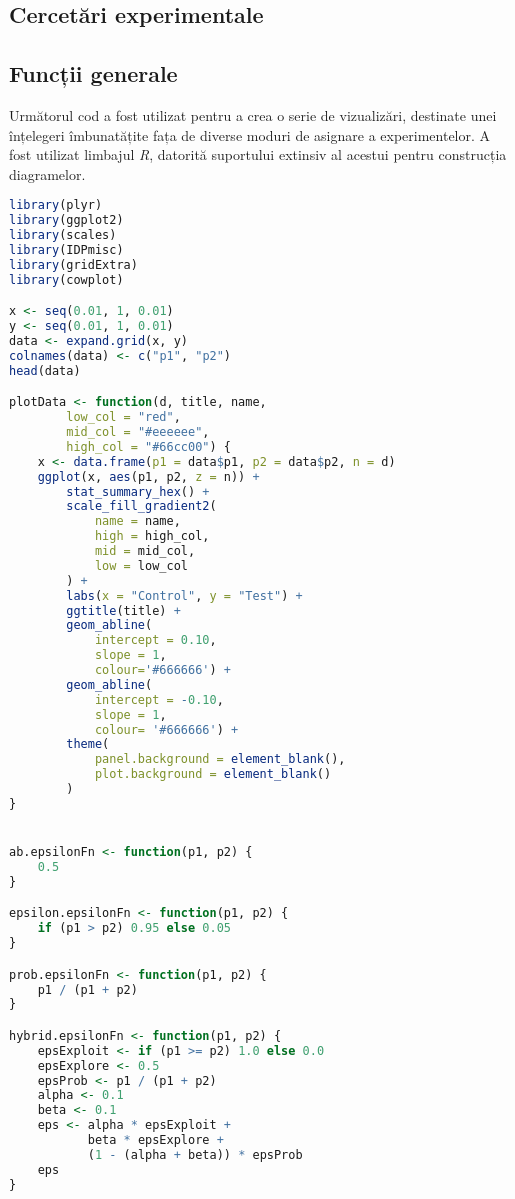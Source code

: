 \begin{appendices}
\chapter{Cercetări experimentale}

\section{Funcții generale}

Următorul cod a fost utilizat pentru a crea o serie de vizualizări, destinate unei înțelegeri îmbunatățite fața de diverse moduri de asignare a experimentelor. A fost utilizat limbajul \textit{R}, datorită suportului extinsiv al acestui pentru construcția diagramelor.

\begin{center}
	\begin{lstlisting}[language=r]
library(plyr)
library(ggplot2)
library(scales)
library(IDPmisc)
library(gridExtra)
library(cowplot)

x <- seq(0.01, 1, 0.01)
y <- seq(0.01, 1, 0.01)
data <- expand.grid(x, y)
colnames(data) <- c("p1", "p2")
head(data)

plotData <- function(d, title, name, 
		low_col = "red",
		mid_col = "#eeeeee", 
		high_col = "#66cc00") {
	x <- data.frame(p1 = data$p1, p2 = data$p2, n = d)
	ggplot(x, aes(p1, p2, z = n)) +  
		stat_summary_hex() + 
		scale_fill_gradient2(
			name = name,
			high = high_col,
			mid = mid_col,
			low = low_col
		) +
		labs(x = "Control", y = "Test") +
		ggtitle(title) +
		geom_abline(
			intercept = 0.10, 
			slope = 1, 
			colour='#666666') +
		geom_abline(
			intercept = -0.10, 
			slope = 1, 
			colour= '#666666') +
		theme(
			panel.background = element_blank(),
			plot.background = element_blank()
		)	 
}


ab.epsilonFn <- function(p1, p2) {
	0.5
}

epsilon.epsilonFn <- function(p1, p2) {
	if (p1 > p2) 0.95 else 0.05
}

prob.epsilonFn <- function(p1, p2) {
	p1 / (p1 + p2)
}

hybrid.epsilonFn <- function(p1, p2) {
	epsExploit <- if (p1 >= p2) 1.0 else 0.0
	epsExplore <- 0.5
	epsProb <- p1 / (p1 + p2)
	alpha <- 0.1
	beta <- 0.1
	eps <- alpha * epsExploit + 
	       beta * epsExplore + 
	       (1 - (alpha + beta)) * epsProb
	eps
}

	\end{lstlisting}
\end{center}


\end{appendices}

